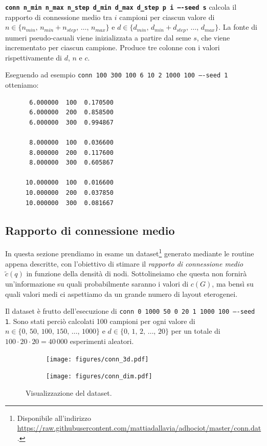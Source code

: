 \documentclass[a4paper,12pt]{article}
\theoremstyle{definition}
\begin{document}
\texttt{\textbf{conn n\_min n\_max n\_step d\_min d\_max d\_step p i ----seed s}} calcola il rapporto di connessione medio tra $i$ campioni per ciascun valore di $n \in \{n_{min},\,n_{min}+n_{step},\,\dots,\,n_{max}\}$ e $d \in \{d_{min},\,d_{min}+d_{step},\,\dots,\,d_{max}\}$. La fonte di numeri pseudo-casuali viene inizializzata a partire dal seme $s$, che viene incrementato per ciascun campione. Produce tre colonne con i valori rispettivamente di $d$, $n$ e $c$.

Eseguendo ad esempio \texttt{conn 100 300 100 6 10 2 1000 100 ----seed 1} otteniamo:

\begin{figure}[H]
\centering
\begin{BVerbatim}
 6.000000  100  0.170500
 6.000000  200  0.858500
 6.000000  300  0.994867

 8.000000  100  0.036600
 8.000000  200  0.117600
 8.000000  300  0.605867

10.000000  100  0.016600
10.000000  200  0.037850
10.000000  300  0.081667
\end{BVerbatim}
\end{figure}

\subsection{Rapporto di connessione medio}

In questa sezione prendiamo in esame un dataset\footnote{Disponibile all'indirizzo \url{https://raw.githubusercontent.com/mattiadallavia/adhociot/master/conn.dat}.} generato mediante le routine appena descritte, con l'obiettivo di stimare il \emph{rapporto di connessione medio} $\tilde{c}(q)$ in funzione della densità di nodi. Sottolineiamo che questa non fornirà un'informazione su quali probabilmente saranno i valori di $c(G)$, ma bensì su quali valori medi ci aspettiamo da un grande numero di layout eterogenei.

Il dataset è frutto dell'esecuzione di \texttt{conn 0 1000 50 0 20 1 1000 100 ----seed 1}. Sono stati perciò calcolati 100 campioni per ogni valore di $n \in \{0,\,50,\,100,\,150,\,\dots,\,1000\}$ e $d \in \{0,\,1,\,2,\,\dots,\,20\}$ per un totale di $100 \cdot 20 \cdot 20 = 40\,000$ esperimenti aleatori.

\begin{figure}[H]
\begin{subfigure}[b]{0.5\textwidth}
\texttt{[image: figures/conn\_3d.pdf]}
\end{subfigure}
\begin{subfigure}[b]{0.5\textwidth}
\texttt{[image: figures/conn\_dim.pdf]}
\end{subfigure}
\caption{Visualizzazione del dataset.}
\end{figure}
\end{document}
